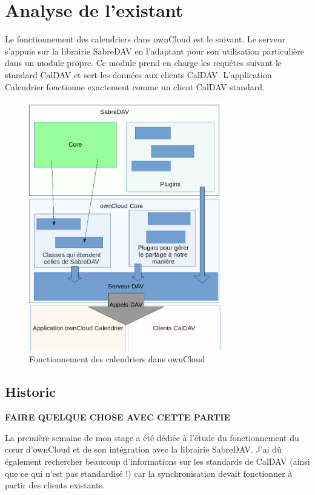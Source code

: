 \documentclass[10pt,a4paper, twoside]{report}
\begin{document}
	\chapter{Analyse de l'existant}
	
	Le fonctionnement des calendriers dans ownCloud est le suivant. Le serveur s'appuie sur la librairie SabreDAV en l'adaptant pour son utilisation particulière dans un module propre. Ce module prend en charge les requêtes suivant le standard CalDAV et sert les données aux clients CalDAV.
	L'application Calendrier fonctionne exactement comme un client CalDAV standard.
	
	\begin{figure}[ht]
		\centering
		\includegraphics[width=0.75\textwidth]{images/schema.png}
		\caption*{Fonctionnement des calendriers dans ownCloud}
		\label{normal_case}
	\end{figure}
	
	\section{Historic}
	\textbf{\color{red}FAIRE QUELQUE CHOSE AVEC CETTE PARTIE}
	
	
	La première semaine de mon stage a été dédiée à l'étude du fonctionnement du cœur d'ownCloud et de son intégration avec la librairie SabreDAV. J'ai dû également rechercher beaucoup d'informations sur les standards de CalDAV (ainsi que ce qui n'est pas standardisé !) car la synchronisation devait fonctionner à partir des clients existants.
	
\end{document}
